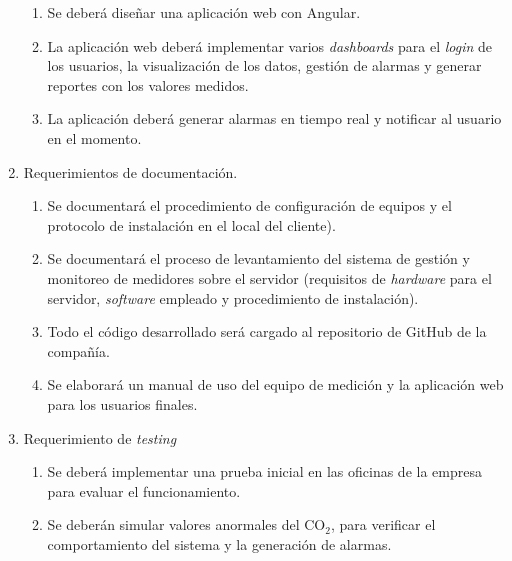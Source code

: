 \documentclass[
11pt, %
]{charter}
\begin{document}
\begin{enumerate}
\begin{enumerate}
			\item Se deberá diseñar una aplicación web con Angular. 
			\item La aplicación web deberá implementar varios \textit{dashboards} para  el \textit{login} de los usuarios, la visualización de los datos, gestión de alarmas y generar reportes con los valores medidos.
			\item La aplicación deberá generar alarmas en tiempo real y notificar al usuario en el momento. 
		\end{enumerate}
	\item Requerimientos de documentación.
		\begin{enumerate}
			\item Se documentará el procedimiento de configuración de equipos y el protocolo de instalación en el local del cliente).
			\item Se documentará el proceso de levantamiento del sistema de gestión y monitoreo de medidores sobre el servidor (requisitos de \textit{hardware} para el servidor, \textit{software} empleado y  procedimiento de instalación).
			\item Todo el código desarrollado será cargado al repositorio de GitHub de la compañía.
			\item Se elaborará un manual de uso del equipo de medición y la aplicación web para los usuarios finales.
		\end{enumerate}
	\item Requerimiento de \textit{testing}
		\begin{enumerate}
			\item Se deberá implementar una prueba inicial en las oficinas de la empresa para evaluar el funcionamiento.
			\item Se deberán simular valores anormales del CO$_{2}$, para verificar el comportamiento del sistema y la generación de alarmas.
			\end{enumerate}
\end{enumerate}
\end{document}
